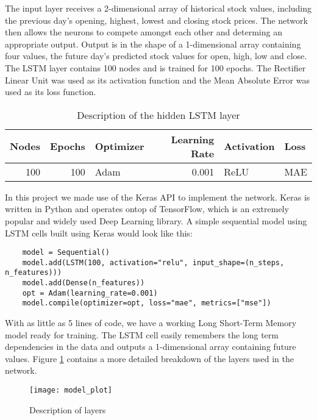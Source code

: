 The input layer receives a 2-dimensional array of historical stock values, including the previous day's opening, highest, lowest and closing stock prices. The network then allows the neurons to compete amongst each other and determing an appropriate output. Output is in the shape of a 1-dimensional array containing four values, the future day's predicted stock values for open, high, low and close. The LSTM layer contains 100 nodes and is trained for 100 epochs. The Rectifier Linear Unit was used as its activation function and the Mean Absolute Error was used as its loss function.

\begin{table}[H]
    \centering
    \begin{tabular}{|r|r|l|r|l|l|}
        \hline
        \textbf{Nodes} & \textbf{Epochs} & \textbf{Optimizer} & \textbf{Learning Rate} & \textbf{Activation} & \textbf{Loss} \\ \hline
        100            & 100             & Adam               & 0.001                  & ReLU                & MAE           \\ \hline
        \end{tabular}
    \caption{Description of the hidden LSTM layer}
    \label{tab:lstm_layer}
\end{table}

In this project we made use of the Keras API to implement the network. Keras is written in Python and operates ontop of TensorFlow, which is an extremely popular and widely used Deep Learning library. A simple sequential model using LSTM cells built using Keras would look like this:

\begin{verbatim}
    model = Sequential()
    model.add(LSTM(100, activation="relu", input_shape=(n_steps, n_features)))
    model.add(Dense(n_features))
    opt = Adam(learning_rate=0.001)
    model.compile(optimizer=opt, loss="mae", metrics=["mse"])
\end{verbatim}

With as little as 5 lines of code, we have a working Long Short-Term Memory model ready for training. The LSTM cell easily remembers the long term dependencies in the data and outputs a 1-dimensional array containing future values. Figure \ref{tab:layer_description} contains a more detailed breakdown of the layers used in the network.

\begin{figure}[H]
    \centering
    \texttt{[image: model\_plot]}
    \caption{Description of layers}
    \label{tab:layer_description}
\end{figure}

